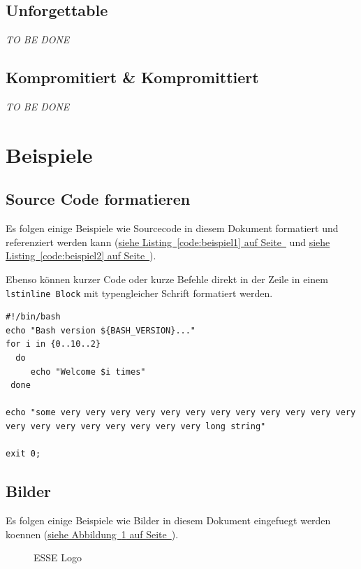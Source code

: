 \documentclass[12pt,a4paper,titlepage,oneside]{scrartcl}
\begin{document}
\subsection{Unforgettable}
\emph{TO BE DONE}

\subsection{Kompromitiert \& Kompromittiert}
\emph{TO BE DONE}

\section{Beispiele}

\subsection{Source Code formatieren}
Es folgen einige Beispiele wie Sourcecode in diesem Dokument formatiert und referenziert werden kann
(\hyperref[code:beispiel1]{siehe Listing~\ref*{code:beispiel1} auf Seite~\pageref*{code:beispiel1}} und \hyperref[code:beispiel2]{siehe Listing~\ref*{code:beispiel2} auf Seite~\pageref*{code:beispiel2}}).

Ebenso können kurzer Code oder kurze Befehle direkt in der Zeile in einem \lstinline{lstinline Block} mit typengleicher Schrift formatiert werden.



\begin{lstlisting}[caption=Example bash script,label=code:beispiel2,style=simple]
#!/bin/bash
echo "Bash version ${BASH_VERSION}..."
for i in {0..10..2}
  do
     echo "Welcome $i times"
 done

echo "some very very very very very very very very very very very very very very very very very very very very long string"

exit 0;
\end{lstlisting}

\subsection{Bilder}

Es folgen einige Beispiele wie Bilder in diesem Dokument eingefuegt werden koennen
(\hyperref[fig:logo1]{siehe Abbildung~\ref*{fig:logo1} auf Seite~\pageref*{fig:logo1}}).

\begin{figure}[h!]
  \centering
  \caption{ESSE Logo}
  \label{fig:logo1}
\end{figure}


%
%
\end{document}
